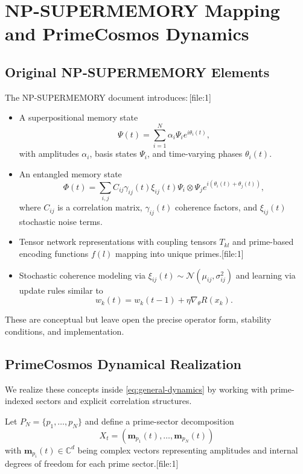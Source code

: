 \documentclass[11pt]{article}
\begin{document}
\section{NP-SUPERMEMORY Mapping and PrimeCosmos Dynamics}

\subsection{Original NP-SUPERMEMORY Elements}

The NP-SUPERMEMORY document introduces:\,[file:1]
\begin{itemize}[leftmargin=1.5em]
\item A superpositional memory state
\[
\Psi(t) = \sum_{i=1}^N \alpha_i \Psi_i e^{i\theta_i(t)},
\]
with amplitudes $\alpha_i$, basis states $\Psi_i$, and time-varying phases $\theta_i(t)$.
\item An entangled memory state
\[
\Phi(t) = \sum_{i,j} C_{ij} \gamma_{ij}(t)\xi_{ij}(t)\Psi_i\otimes\Psi_j e^{i(\theta_i(t)+\theta_j(t))},
\]
where $C_{ij}$ is a correlation matrix, $\gamma_{ij}(t)$ coherence factors, and $\xi_{ij}(t)$ stochastic noise terms.
\item Tensor network representations with coupling tensors $T_{kl}$ and prime-based encoding functions $f(l)$ mapping into unique primes.[file:1]
\item Stochastic coherence modeling via $\xi_{ij}(t)\sim \mathcal{N}(\mu_{ij},\sigma_{ij}^2)$ and learning via update rules similar to
\[
w_k(t)=w_k(t-1)+\eta\nabla_\theta R(x_k).
\]
\end{itemize}

These are conceptual but leave open the precise operator form, stability conditions, and implementation.

\subsection{PrimeCosmos Dynamical Realization}

We realize these concepts inside \eqref{eq:general-dynamics} by working with prime-indexed sectors and explicit correlation structures.

Let $P_N=\{p_1,\dots,p_N\}$ and define a prime-sector decomposition
\[
X_t = ( \mathbf{m}_{p_1}(t),\dots,\mathbf{m}_{p_N}(t) )
\]
with $\mathbf{m}_{p_i}(t)\in\mathbb{C}^{d}$ being complex vectors representing amplitudes and internal degrees of freedom for each prime sector.[file:1]
\end{document}
